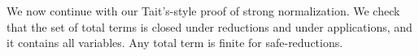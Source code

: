 %
%
%
%
%
%
%

We now continue with our Tait's-style proof of strong normalization.
We check that the set of total terms is closed under reductions and under applications,
and it contains all variables.
Any total term is finite for safe-reductions.

